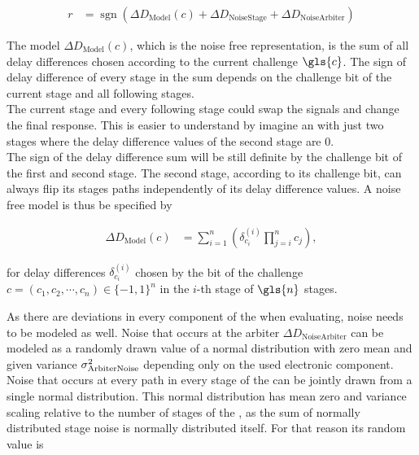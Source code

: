\begin{align}
r &= \operatorname{sgn}(\Delta D_{\mathrm{Model}}(c) + \Delta D_{\mathrm{Noise Stage}} + \Delta D_{\mathrm{Noise Arbiter}}) \label{equ:pufresponse}
\end{align}

The model $\Delta D_{\mathrm{Model}}(c)$, which is the noise free \apuf representation, is the sum of all delay differences chosen according to the current challenge $\gls{c}$.
The sign of delay difference of every stage in the sum depends on the challenge bit of the current stage and all following stages.\\
The current stage and every following stage could swap the signals and change the final response.
This is easier to understand by imagine an \apuf with just two stages where the delay difference values of the second stage are 0.\\ 
The sign of the delay difference sum will be still definite by the challenge bit of the first and second stage.
The second stage, according to its challenge bit, can always flip its stages paths independently of its delay difference values.
A noise free \apuf model is thus be specified by

\begin{align}
\Delta D_{\mathrm{Model}}(c) &= \sum_{i=1}^{n}\left(\delta_{c_{i}}^{(i)}\prod_{j=i}^{n}c_{j}\right), \label{equ:pufmodelc}
\end{align}

for delay differences $\delta_{c_{i}}^{(i)}$ chosen by the bit of the challenge $c = (c_1, c_2, \cdots, c_n) \in \{-1, 1\}^n$ in the $i$-th stage of $\gls{n}$ stages.

As there are deviations in every component of the \puf when evaluating, noise needs to be modeled as well.
Noise that occurs at the arbiter $\Delta D_{\mathrm{Noise Arbiter}}$ can be modeled as a randomly drawn value of a normal distribution with zero mean and given variance $\sigma_{\mathrm{Arbiter Noise}}^2$ depending only on the used electronic component.\\
Noise that occurs at every path in every stage of the \apuf can be jointly drawn from a single normal distribution.
This normal distribution has mean zero and variance scaling relative to the number of stages of the \apuf, as the sum of normally distributed stage noise is normally distributed itself.
For that reason its random value is 

